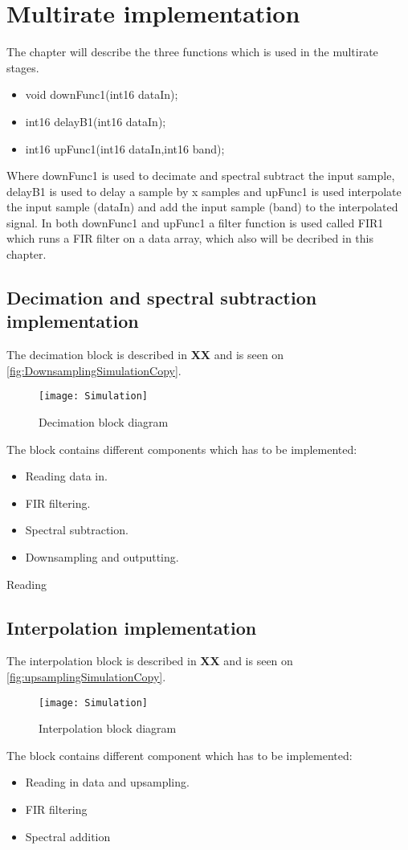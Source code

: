 \chapter{Multirate implementation}
The chapter will describe the three functions which is used in the multirate stages.
\begin{itemize}
\item void downFunc1(int16 dataIn);
\item int16 delayB1(int16 dataIn);
\item int16 upFunc1(int16 dataIn,int16 band);
\end{itemize}
Where downFunc1 is used to decimate and spectral subtract the input sample, delayB1 is used to delay a sample by x samples and upFunc1 is used interpolate the input sample (dataIn) and add the input sample (band) to the interpolated signal. In both downFunc1 and upFunc1 a filter function is used called FIR1 which runs a FIR filter on a data array, which also will be decribed in this chapter. 



\section{Decimation and spectral subtraction implementation}
The decimation block is described in \textbf{XX} and is seen on \autoref{fig:DownsamplingSimulationCopy}.
\begin{figure}[H]
    \centering
	\texttt{[image: Simulation]}
    \caption{Decimation block diagram}
    \label{fig:DownsamplingSimulationCopy}
\end{figure}
The block contains different components which has to be implemented:
\begin{itemize}
\item Reading data in.
\item FIR filtering.
\item Spectral subtraction.
\item Downsampling and outputting. 
\end{itemize}
Reading 



\section{Interpolation implementation}
The interpolation block is described in \textbf{XX} and is seen on \autoref{fig:upsamplingSimulationCopy}.
\begin{figure}[H]
    \centering
	\texttt{[image: Simulation]}
    \caption{Interpolation block diagram}
    \label{fig:upsamplingSimulationCopy}
\end{figure}
The block contains different component which has to be implemented:
\begin{itemize}
\item Reading in data and upsampling.
\item FIR filtering
\item Spectral addition
\end{itemize}


